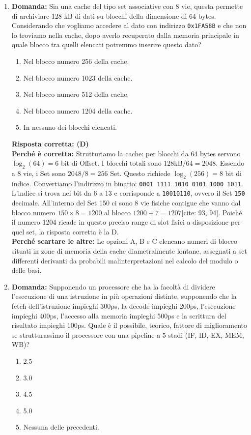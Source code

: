 \documentclass[12pt, a4paper]{article}
\begin{document}
\begin{enumerate}
    \item \textbf{Domanda:} Sia una cache del tipo set associative con 8 vie, questa permette di archiviare 128 kB di dati su blocchi della dimensione di 64 bytes. Considerando che vogliamo accedere al dato con indirizzo \texttt{0x1FA58B} e che non lo troviamo nella cache, dopo averlo recuperato dalla memoria principale in quale blocco tra quelli elencati potremmo inserire questo dato?
    \begin{enumerate}[label=(\Alph*)]
        \item Nel blocco numero 256 della cache.
        \item Nel blocco numero 1023 della cache.
        \item Nel blocco numero 512 della cache.
        \item Nel blocco numero 1204 della cache.
        \item In nessuno dei blocchi elencati.
    \end{enumerate}
    \textbf{Risposta corretta: (D)} \\
    \textbf{Perché è corretta:} Strutturiamo la cache: per blocchi da 64 bytes servono $\log_2(64)=6$ bit di Offset. I blocchi totali sono $128\text{kB} / 64 = 2048$. Essendo a 8 vie, i Set sono $2048 / 8 = 256$ Set. Questo richiede $\log_2(256)=8$ bit di indice. Convertiamo l'indirizzo in binario: \texttt{0001 1111 1010 0101 1000 1011}. L'indice si trova nei bit da 6 a 13 e corrisponde a \texttt{10010110}, ovvero il Set \texttt{150} decimale. All'interno del Set 150 ci sono 8 vie fisiche contigue che vanno dal blocco numero $150 \times 8 = 1200$ al blocco $1200 + 7 = 1207$[cite: 93, 94]. Poiché il numero 1204 ricade in questo preciso range di slot fisici a disposizione per quel set, la risposta corretta è la D. \\
    \textbf{Perché scartare le altre:} Le opzioni A, B e C elencano numeri di blocco situati in zone di memoria della cache diametralmente lontane, assegnati a set differenti derivanti da probabili malinterpretazioni nel calcolo del modulo o delle basi.

    \item \textbf{Domanda:} Supponendo un processore che ha la facoltà di dividere l'esecuzione di una istruzione in più operazioni distinte, supponendo che la fetch dell'istruzione impieghi 300ps, la decode impieghi 200ps, l'esecuzione impieghi 400ps, l'accesso alla memoria impieghi 500ps e la scrittura del risultato impieghi 100ps. Quale è il possibile, teorico, fattore di miglioramento se strutturassimo il processore con una pipeline a 5 stadi (IF, ID, EX, MEM, WB)?
    \begin{enumerate}[label=(\Alph*)]
        \item 2.5
        \item 3.0
        \item 4.5
        \item 5.0
        \item Nessuna delle precedenti.
    \end{enumerate}


\end{enumerate}
\end{document}
